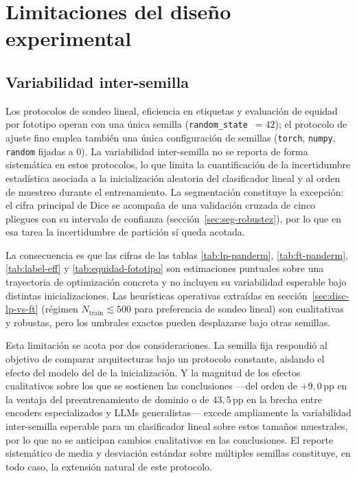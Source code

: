 \section{Limitaciones del diseño experimental}
\label{sec:lim-diseno}

\subsection{Variabilidad inter-semilla}
\label{sec:lim-semilla}

Los protocolos de sondeo lineal, eficiencia en etiquetas y
evaluación de equidad por fototipo operan con una única semilla
(\texttt{random\_state}~$=42$); el protocolo de ajuste fino emplea
también una única configuración de
semillas (\texttt{torch}, \texttt{numpy}, \texttt{random} fijadas a
$0$). La variabilidad inter-semilla no se reporta de forma
sistemática en estos protocolos, lo que limita la cuantificación de
la incertidumbre estadística asociada a la inicialización aleatoria
del clasificador lineal y al orden de muestreo durante el
entrenamiento. La segmentación constituye la excepción: el
cifra principal de Dice se acompaña de una validación cruzada de
cinco pliegues con su intervalo de confianza
(sección~\ref{sec:seg-robustez}), por lo que en esa tarea la
incertidumbre de partición sí queda acotada.

La consecuencia es que las cifras de las tablas
\ref{tab:lp-panderm}, \ref{tab:ft-panderm}, \ref{tab:label-eff} y
\ref{tab:equidad-fototipo} son estimaciones puntuales sobre una
trayectoria de optimización concreta y no incluyen su variabilidad
esperable bajo distintas inicializaciones. Las heurísticas
operativas extraídas en sección~\ref{sec:disc-lp-vs-ft}
(régimen $N_{\mathrm{train}} \lesssim 500$ para preferencia de
sondeo lineal) son cualitativas y robustas, pero los umbrales
exactos pueden desplazarse bajo otras semillas.

Esta limitación se acota por dos consideraciones. La semilla fija
respondió al objetivo de comparar arquitecturas bajo un protocolo
constante, aislando el efecto del modelo del de la inicialización. Y
la magnitud de los efectos cualitativos sobre los que se sostienen las
conclusiones ---del orden de $+9{,}0$\,pp en la ventaja del
preentrenamiento de dominio o de $43{,}5$\,pp en la brecha entre
encoders especializados y LLMs generalistas--- excede ampliamente la
variabilidad inter-semilla esperable para un clasificador lineal sobre
estos tamaños muestrales, por lo que no se anticipan cambios
cualitativos en las conclusiones. El reporte sistemático de media y
desviación estándar sobre múltiples semillas constituye, en todo caso,
la extensión natural de este protocolo.

